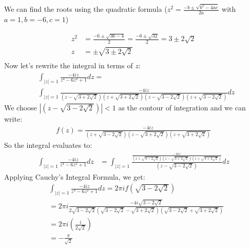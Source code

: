 \begin{example}
    We can find the roots using the quadratic formula ($z^2 = \frac{-b \pm \sqrt{b^2 - 4ac}}{2a}$ with $a = 1, b = -6, c = 1$)

    \begin{align*}
        z^2 & = \frac{-6 \pm \sqrt{36 - 4}}{2} = \frac{-6 \pm \sqrt{32}}{2} = 3 \pm 2\sqrt{2} \\
        z   & = \pm\sqrt{3 \pm 2\sqrt{2}}                                                     \\
    \end{align*}
    Now let's rewrite the integral in terms of $z$:
    \begin{align*}
         & \int_{|z|=1}\frac{-4iz}{z^4 - 6z^2 + 1} dz  =                                                                                        \\
         & \int_{|z|=1}\frac{-4iz}{(z - \sqrt{3 + 2\sqrt{2}})(z + \sqrt{3 + 2\sqrt{2}})(z - \sqrt{3 - 2\sqrt{2}})(z + \sqrt{3 - 2\sqrt{2}})} dz
    \end{align*}
    We choose $|(z - \sqrt{3 - 2\sqrt{2}})| < 1$ as the contour of integration and we can write:
    \begin{align*}
        f(z) = \frac{-4iz}{(z + \sqrt{3 - 2\sqrt{2}})(z - \sqrt{3 + 2\sqrt{2}})(z + \sqrt{3 + 2\sqrt{2}})}
    \end{align*}
    So the integral evaluates to:
    \begin{align*}
        \int_{|z|=1}\frac{-4iz}{z^4 - 6z^2 + 1} dz & = \int_{|z|=1}\frac{\frac{-4iz}{(z + \sqrt{3 - 2\sqrt{2}})(z - \sqrt{3 + 2\sqrt{2}})(z + \sqrt{3 + 2\sqrt{2}})}}{(z - \sqrt{3 - 2\sqrt{2}})} dz
    \end{align*}
    Applying Cauchy's Integral Formula, we get:
    \begin{align*}
         & \int_{|z|=1}\frac{-4iz}{z^4 - 6z^2 + 1} dz = 2\pi i f(\sqrt{3 - 2\sqrt{2}})                                                                            \\
         & = 2\pi i \frac{-4i\sqrt{3 - 2\sqrt{2}}}{2\sqrt{3 - 2\sqrt{2}}(\sqrt{3 - 2\sqrt{2}} - \sqrt{3 + 2\sqrt{2}})(\sqrt{3 - 2\sqrt{2}}+\sqrt{3 + 2\sqrt{2}})} \\
         & = 2\pi i (\frac{i}{2\sqrt2})                                                                                                                           \\
         & = -\frac{\pi}{\sqrt{2}}
    \end{align*}
\end{example}

